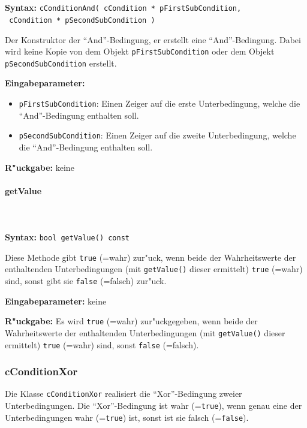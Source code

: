 \ \\\\\noindent
\textbf{Syntax:} \verb|cConditionAnd( cCondition * pFirstSubCondition,| \\\verb| cCondition * pSecondSubCondition )|

\bigskip\noindent
Der Konstruktor der ``And''-Bedingung, er erstellt eine ``And''-Bedingung. Dabei wird keine Kopie von dem Objekt \verb|pFirstSubCondition| oder dem Objekt \verb|pSecondSubCondition| erstellt.

\bigskip\noindent
\textbf{Eingabeparameter:}
\begin{itemize}
 \item \verb|pFirstSubCondition|: Einen Zeiger auf die erste Unterbedingung, welche die ``And''-Bedingung enthalten soll.
 \item \verb|pSecondSubCondition|: Einen Zeiger auf die zweite Unterbedingung, welche die ``And''-Bedingung enthalten soll.
\end{itemize}

\bigskip\noindent
\textbf{R"uckgabe:} keine


\paragraph{getValue}

\ \\\\\noindent
\textbf{Syntax:} \verb|bool getValue() const|

\bigskip\noindent
Diese Methode gibt \verb|true| (=wahr) zur"uck, wenn beide der Wahrheitswerte der enthaltenden Unterbedingungen (mit \verb|getValue()| dieser ermittelt) \verb|true| (=wahr) sind, sonst gibt sie \verb|false| (=falsch) zur"uck.

\bigskip\noindent
\textbf{Eingabeparameter:} keine

\bigskip\noindent
\textbf{R"uckgabe:} Es wird \verb|true| (=wahr) zur"uckgegeben, wenn beide der Wahrheitswerte der enthaltenden Unterbedingungen (mit \verb|getValue()| dieser ermittelt) \verb|true| (=wahr) sind, sonst \verb|false| (=falsch).


\subsubsection{cConditionXor}

Die Klasse \verb|cConditionXor| realisiert die ``Xor''-Bedingung zweier Unterbedingungen. Die ``Xor''-Bedingung ist wahr (=\verb|true|), wenn genau eine der Unterbedingungen wahr (=\verb|true|) ist, sonst ist sie falsch  (=\verb|false|).

